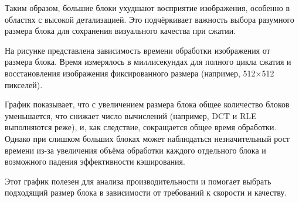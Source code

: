 Таким образом, большие блоки ухудшают восприятие изображения, особенно в областях с высокой детализацией. 
Это подчёркивает важность выбора разумного размера блока для сохранения визуального качества при сжатии.


На рисунке представлена зависимость времени обработки изображения от размера блока. 
Время измерялось в миллисекундах для полного цикла сжатия и восстановления изображения фиксированного 
размера (например, 512×512 пикселей).

График показывает, что с увеличением размера блока общее количество блоков уменьшается, 
что снижает число вычислений (например, DCT и RLE выполняются реже), и, как следствие, 
сокращается общее время обработки. 
Однако при слишком больших блоках может наблюдаться незначительный рост времени из-за увеличения объёма 
обработки каждого отдельного блока и возможного падения эффективности кэширования.

Этот график полезен для анализа производительности и помогает выбрать подходящий размер блока в 
зависимости от требований к скорости и качеству.